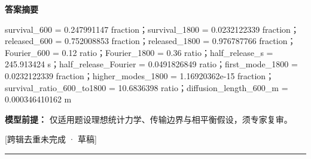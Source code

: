 \documentclass[UTF8,11pt,a4paper]{ctexart}
\begin{document}
\noindent\textbf{答案摘要}\par
survival\_600 = 0.247991147 fraction；survival\_1800 = 0.0232122339 fraction；released\_600 = 0.752008853 fraction；released\_1800 = 0.976787766 fraction；Fourier\_600 = 0.12 ratio；Fourier\_1800 = 0.36 ratio；half\_release\_s = 245.913424 s；half\_release\_Fourier = 0.0491826849 ratio；first\_mode\_1800 = 0.0232122339 fraction；higher\_modes\_1800 = 1.16920362e-15 fraction；survival\_ratio\_600\_to1800 = 10.6836398 ratio；diffusion\_length\_600\_m = 0.000346410162 m\par
\noindent\textbf{模型前提：}
仅适用题设理想统计力学、传输边界与相平衡假设，须专家复审。\par
\noindent\textcolor{red!65!black}{[跨辑去重未完成 · 草稿]} \par
\medskip\hrule\medskip
{}
\end{document}
